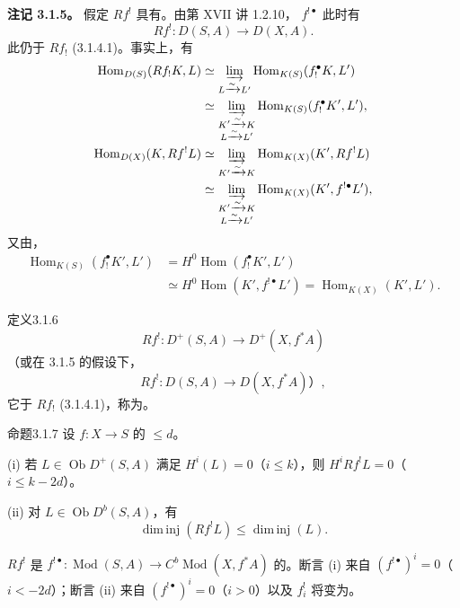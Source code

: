 \textbf{注记 3.1.5。} 假定 $Rf^!$ 具有。由第 XVII 讲 1.2.10， $f^{!\bullet}$ 此时有
\[
 Rf^!\colon D(S,A)\longrightarrow D(X,A).\tag{3.1.5.1}
\]
此仍于 $Rf_!$ (3.1.4.1)。事实上，有
\begin{align*}
\operatorname{Hom}_{D(S)}(Rf_!K,L)
 &\simeq\varinjlim_{L\xrightarrow{\sim}L'}\operatorname{Hom}_{K(S)}(f_!^\bullet K,L')\\
 &\simeq\varinjlim_{\substack{K'\xrightarrow{\sim}K\\L\xrightarrow{\sim}L'}}\operatorname{Hom}_{K(S)}(f_!^\bullet K',L'),\\
\operatorname{Hom}_{D(X)}(K,Rf^!L)
 &\simeq\varinjlim_{K'\xrightarrow{\sim}K}\operatorname{Hom}_{K(X)}(K',Rf^!L)\\
 &\simeq\varinjlim_{\substack{K'\xrightarrow{\sim}K\\L\xrightarrow{\sim}L'}}\operatorname{Hom}_{K(X)}(K',f^{!\bullet}L'),
\end{align*}
又由，
\begin{align*}
\operatorname{Hom}_{K(S)}(f_!^\bullet K',L')
 &=H^0\operatorname{Hom}(f_!^\bullet K',L')\\
 &\simeq H^0\operatorname{Hom}(K',f^{!\bullet}L')
 =\operatorname{Hom}_{K(X)}(K',L').
\end{align*}

\begin{SGAresult}{定义}{3.1.6}
\[
 Rf^!\colon D^+(S,A)\longrightarrow D^+(X,f^*A)
\]
（或在 3.1.5 的假设下，
\[
 Rf^!\colon D(S,A)\longrightarrow D(X,f^*A)\text{）},
\]
它于 $Rf_!$ (3.1.4.1)，称为。
\end{SGAresult}

\begin{SGAresult}{命题}{3.1.7}
设 $f\colon X\to S$ 的 $\leq d$。

(i) 若 $L\in\operatorname{Ob}D^+(S,A)$ 满足 $H^i(L)=0$（$i\leq k$），则 $H^iRf^!L=0$（$i\leq k-2d$）。

(ii) 对 $L\in\operatorname{Ob}D^b(S,A)$，有
\[
 \operatorname{dim\,inj}(Rf^!L)\leq\operatorname{dim\,inj}(L).
\]
\end{SGAresult}
 $Rf^!$ 是 $f^{!\bullet}\colon\operatorname{Mod}(S,A)\to C^b\operatorname{Mod}(X,f^*A)$ 的。断言 (i) 来自 $(f^{!\bullet})^i=0$（$i<-2d$）；断言 (ii) 来自 $(f^{!\bullet})^i=0$（$i>0$）以及 $f_i^!$ 将变为。

